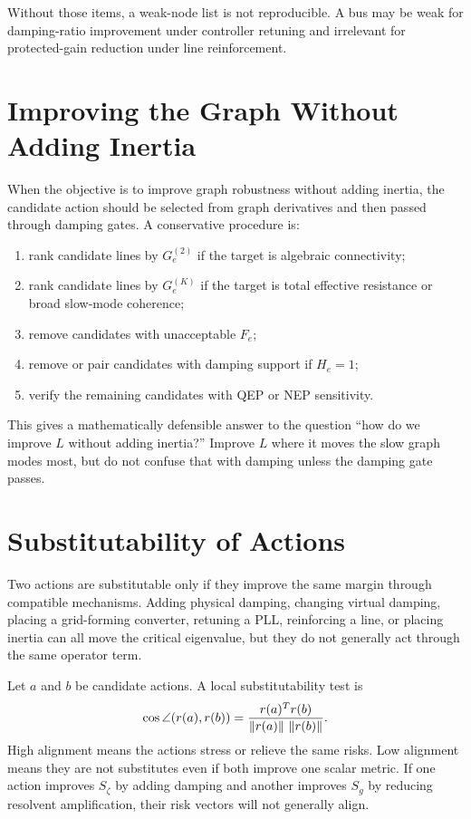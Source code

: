 Without those items, a weak-node list is not reproducible. A bus may be weak
for damping-ratio improvement under controller retuning and irrelevant for
protected-gain reduction under line reinforcement.

\section{Improving the Graph Without Adding Inertia}

When the objective is to improve graph robustness without adding inertia, the
candidate action should be selected from graph derivatives and then passed
through damping gates. A conservative procedure is:
\begin{enumerate}
\item rank candidate lines by \(G_e^{(2)}\) if the target is algebraic
connectivity;
\item rank candidate lines by \(G_e^{(K)}\) if the target is total effective
resistance or broad slow-mode coherence;
\item remove candidates with unacceptable \(F_e\);
\item remove or pair candidates with damping support if \(H_e=1\);
\item verify the remaining candidates with QEP or NEP sensitivity.
\end{enumerate}

This gives a mathematically defensible answer to the question ``how do we
improve \(L\) without adding inertia?'' Improve \(L\) where it moves the slow
graph modes most, but do not confuse that with damping unless the damping gate
passes.

\section{Substitutability of Actions}

Two actions are substitutable only if they improve the same margin through
compatible mechanisms. Adding physical damping, changing virtual damping,
placing a grid-forming converter, retuning a PLL, reinforcing a line, or
placing inertia can all move the critical eigenvalue, but they do not generally
act through the same operator term.

Let \(a\) and \(b\) be candidate actions. A local substitutability test is
\begin{equation}
  \cos\angle(r(a),r(b))
  =
  \frac{r(a)^Tr(b)}{\left\lVert r(a) \right\rVert\,\left\lVert r(b) \right\rVert}.
  \label{eq:risk_vector_angle}
\end{equation}
High alignment means the actions stress or relieve the same risks. Low
alignment means they are not substitutes even if both improve one scalar
metric. If one action improves \(S_\zeta\) by adding damping and another
improves \(S_g\) by reducing resolvent amplification, their risk vectors will
not generally align.

